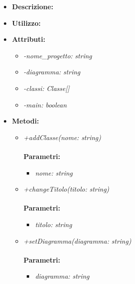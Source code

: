 \begin{itemize}
	\item \textbf{Descrizione:}\\
	
	\item \textbf{Utilizzo:}\\
	
	\item \textbf{Attributi:}
		\begin{itemize}
			\item \emph{-nome_progetto: string}\\
			
			\item \emph{-diagramma: string}\\
			
			\item \emph{-classi: Classe[]}\\
			
			\item \emph{-main: boolean}\\
			
		\end{itemize}
	\item \textbf{Metodi:}
		\begin{itemize}
			\item \emph{+addClasse(nome: string)}\\
    		\\
    		\textbf{Parametri:}
    		\begin{itemize}
    			\item \emph{nome: string}\\
    			
    		\end{itemize}
    		\item \emph{+changeTitolo(titolo: string)}\\
    		\\
    		\textbf{Parametri:}
    		\begin{itemize}
    			\item \emph{titolo: string}\\
    			
    		\end{itemize}
    		\item \emph{+setDiagramma(diagramma: string)}\\
    		\\
    		\textbf{Parametri:}
    		\begin{itemize}
    			\item \emph{diagramma: string}\\
    			

\end{itemize}
\end{itemize}
\end{itemize}
